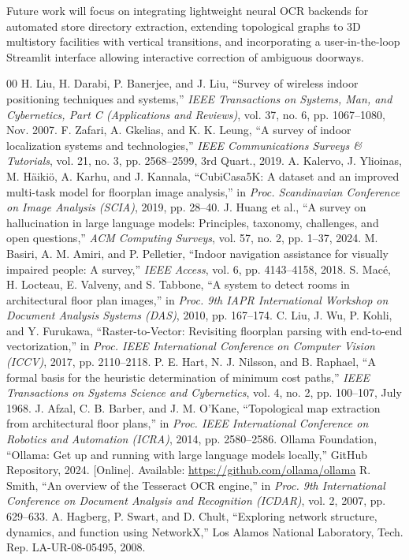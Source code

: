 \documentclass[conference]{IEEEtran}
\begin{document}
Future work will focus on integrating lightweight neural OCR backends for automated store directory extraction, extending topological graphs to 3D multistory facilities with vertical transitions, and incorporating a user-in-the-loop Streamlit interface allowing interactive correction of ambiguous doorways.

\begin{thebibliography}{00}
 H. Liu, H. Darabi, P. Banerjee, and J. Liu, ``Survey of wireless indoor positioning techniques and systems,'' \emph{IEEE Transactions on Systems, Man, and Cybernetics, Part C (Applications and Reviews)}, vol. 37, no. 6, pp. 1067--1080, Nov. 2007.
 F. Zafari, A. Gkelias, and K. K. Leung, ``A survey of indoor localization systems and technologies,'' \emph{IEEE Communications Surveys \& Tutorials}, vol. 21, no. 3, pp. 2568--2599, 3rd Quart., 2019.
 A. Kalervo, J. Ylioinas, M. H\"aiki\"o, A. Karhu, and J. Kannala, ``CubiCasa5K: A dataset and an improved multi-task model for floorplan image analysis,'' in \emph{Proc. Scandinavian Conference on Image Analysis (SCIA)}, 2019, pp. 28--40.
 J. Huang et al., ``A survey on hallucination in large language models: Principles, taxonomy, challenges, and open questions,'' \emph{ACM Computing Surveys}, vol. 57, no. 2, pp. 1--37, 2024.
 M. Basiri, A. M. Amiri, and P. Pelletier, ``Indoor navigation assistance for visually impaired people: A survey,'' \emph{IEEE Access}, vol. 6, pp. 4143--4158, 2018.
 S. Mac\'e, H. Locteau, E. Valveny, and S. Tabbone, ``A system to detect rooms in architectural floor plan images,'' in \emph{Proc. 9th IAPR International Workshop on Document Analysis Systems (DAS)}, 2010, pp. 167--174.
 C. Liu, J. Wu, P. Kohli, and Y. Furukawa, ``Raster-to-Vector: Revisiting floorplan parsing with end-to-end vectorization,'' in \emph{Proc. IEEE International Conference on Computer Vision (ICCV)}, 2017, pp. 2110--2118.
 P. E. Hart, N. J. Nilsson, and B. Raphael, ``A formal basis for the heuristic determination of minimum cost paths,'' \emph{IEEE Transactions on Systems Science and Cybernetics}, vol. 4, no. 2, pp. 100--107, July 1968.
 J. Afzal, C. B. Barber, and J. M. O'Kane, ``Topological map extraction from architectural floor plans,'' in \emph{Proc. IEEE International Conference on Robotics and Automation (ICRA)}, 2014, pp. 2580--2586.
 Ollama Foundation, ``Ollama: Get up and running with large language models locally,'' GitHub Repository, 2024. [Online]. Available: \url{https://github.com/ollama/ollama}
 R. Smith, ``An overview of the Tesseract OCR engine,'' in \emph{Proc. 9th International Conference on Document Analysis and Recognition (ICDAR)}, vol. 2, 2007, pp. 629--633.
 A. Hagberg, P. Swart, and D. Chult, ``Exploring network structure, dynamics, and function using NetworkX,'' Los Alamos National Laboratory, Tech. Rep. LA-UR-08-05495, 2008.
\end{thebibliography}
\end{document}
